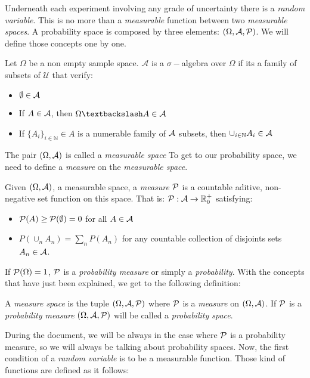 Underneath each experiment involving any grade of uncertainty there is a \emph{random variable}. This is no more than a \emph{measurable} function between two \emph{measurable spaces}.
A probability space is composed by three elements: $(\Omega, \mathcal{A}, \mathcal{P})$. We will define those concepts one by one.

\begin{ndef}Let $\Omega$ be a non empty sample space. $\mathcal A$ is a $\sigma-$algebra over $\Omega$ if its a family of subsets of $\mathcal U$ that verify:
\begin{itemize}
  \item $\emptyset \in \mathcal{A}$
  \item If $A \in \mathcal{A}$, then $\Omega \textbackslash A \in \Alg$
  \item If $\{A_i\}_{i \in \mathbb N} \in A$ is a numerable family of $\mathcal{A}$ subsets, then $\cup_{i \in \mathbb N} A_i \in \mathcal{A}$
\end{itemize}
\end{ndef}


The pair $(\Omega,\mathcal{A})$ is called a \emph{measurable space} To get to our probability space, we need to define a \emph{measure} on the \emph{measurable space}.

\begin{ndef}
Given $(\Omega,\mathcal{A})$, a measurable space, a \emph{measure} $\mathcal{P}$ is a countable aditive, non-negative set function on this space. That is: $\mathcal{P}: \mathcal{A} \to \mathbb R_0^+$ satisfying:
\begin{itemize}
  \item $\mathcal{P}(A) \geq \mathcal{P}(\emptyset) = 0$ for all $A \in \mathcal{A}$
  \item $P(\cup_n A_n) = \sum_n P(A_n)$ for any countable collection of disjoints sets $A_n \in \mathcal{A}$.
\end{itemize}
\end{ndef}

If $\mathcal{P}(\Omega) = 1$, $\mathcal{P}$ is a \emph{probability measure} or simply a \emph{probability}. With the concepts that have just been explained, we get to the following definition:

\begin{ndef}
A \emph{measure space} is the tuple $(\Omega, \mathcal{A},\mathcal{P})$ where $\mathcal{P}$ is a \emph{measure} on $(\Omega, \mathcal{A})$. If $\mathcal{P}$ is a \emph{probability measure} $(\Omega,\mathcal{A},\mathcal{P})$ will be called a \emph{probability space}.
\end{ndef}

During the document, we will be always in the case where $\mathcal{P}$ is a probability measure, so we will always be talking about probability spaces. Now, the first condition of a \emph{random variable} is to be a measurable function. Those kind of functions are defined as it follows:

